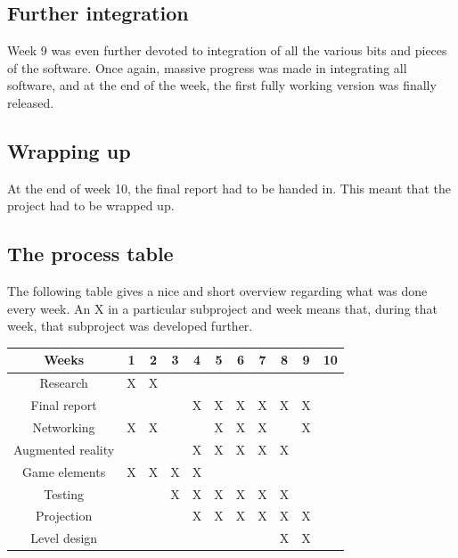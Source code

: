 		\subsection{Further integration}
			Week 9 was even further devoted to integration of all the various bits and
			pieces of the software. Once again, massive progress was made in
			integrating all software, and at the end of the week, the first fully
			working version was finally released. 
		 
		\subsection{Wrapping up}
			At the end of week 10, the final report had to be handed in. This meant
			that the project had to be wrapped up.
		 
		\subsection{The process table} \label{ssec:processtable}
			The following table gives a nice and short overview regarding what was done
			every week. An X in a particular subproject and week means that, during that
			week, that subproject was developed further.
			
			\begin{table}[!ht]                                                                                      
				\begin{tabular}{| c | c | c | c | c | c | c | c | c | c | c |}
				\hline
				Weeks             & 1      & 2      & 3      & 4      & 5      & 6      & 7      & 8      & 9      & 10     \\ \hline
				Research          & X      & X      & \space & \space & \space & \space & \space & \space & \space & \space \\ \hline
				Final report      & \space & \space & \space & X     & X      & X      & X      & X      & X      & \space \\ \hline\sqrt{}
				Networking        & X      & X      & \space & \space & X      & X      & X      & \space & X      & \space \\ \hline
				Augmented reality & \space & \space & \space & X      & X      & X      & X      & X      & \space & \space \\ \hline
				Game elements     & X      & X      & X      & X      & \space & \space & \space & \space & \space & \space \\ \hline
				Testing           & \space & \space & X      & X      & X      & X      & X      & X      & \space & \space \\ \hline
				Projection        & \space & \space & \space & X      & X      & X      & X      & X      & X      & \space \\ \hline
				Level design      & \space & \space & \space & \space & \space & \space & \space & X      & X      & \space \\ \hline
				\end{tabular}
			\end{table}
